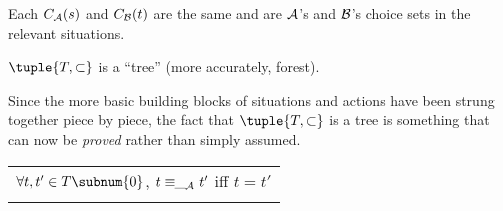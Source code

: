 \noindent Each $C_{\cal A}(s)$ and $C_{\cal B}(t)$ are the same and are $\cal A$'s and $\cal B$'s choice sets in the relevant situations.


\begin{proposition} \hspace{.1pc} $\tuple{T,\subset}$ is a ``tree'' (more accurately, forest). \end{proposition}


\noindent Since the more basic building blocks of situations and actions have been strung together piece by piece, the fact that $\tuple{T,\subset}$ is a tree is something that can now be \emph{proved} rather than simply assumed.




\begin{definition}\label{def:A.4}\begin{tabular}[t]{l} 
{$\forall t,t' \in T\subnum{0}$, $t \equiv\!\!\__{\cal A}\,\, t'$ iff $t = t'$}\\ 
\noindent {$\forall t,t' \in T\subnum{1}$,  $t \equiv\!\!\__{\cal B}\,\, t'$ 
}
 \end{tabular} \end{definition}





